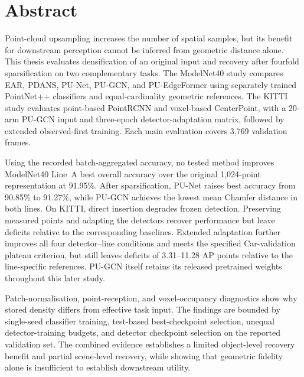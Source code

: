 \chapter*{Abstract}
Point-cloud upsampling increases the number of spatial samples, but its
benefit for downstream perception cannot be inferred from geometric
distance alone. This thesis evaluates densification of an original input
and recovery after fourfold sparsification on two complementary tasks.
The ModelNet40 study compares EAR, PDANS, PU-Net, PU-GCN, and PU-EdgeFormer
using separately trained PointNet++ classifiers and equal-cardinality
geometric references. The KITTI study evaluates point-based PointRCNN
and voxel-based CenterPoint, with a 20-arm PU-GCN input and three-epoch
detector-adaptation matrix, followed by extended observed-first training.
Each main evaluation covers 3,769 validation frames.

Using the recorded batch-aggregated accuracy, no tested method improves
ModelNet40 Line~A best overall accuracy over
the original 1,024-point representation at 91.95\%. After sparsification,
PU-Net raises best accuracy from 90.85\% to 91.27\%, while PU-GCN achieves
the lowest mean Chamfer distance in both lines. On KITTI, direct insertion
degrades frozen detection. Preserving measured points and adapting the
detectors recover performance but leave deficits relative to the
corresponding baselines. Extended adaptation further improves all four
detector--line conditions and meets the specified Car-validation plateau
criterion, but still leaves deficits of 3.31--11.28 AP points relative
to the line-specific references. PU-GCN itself retains its released
pretrained weights throughout this later study.

Patch-normalisation, point-reception, and voxel-occupancy diagnostics show
why stored density differs from effective task input. The findings are
bounded by single-seed classifier training, test-based best-checkpoint
selection, unequal detector-training budgets, and detector checkpoint
selection on the reported validation set. The combined evidence establishes a
limited object-level recovery benefit and partial scene-level recovery,
while showing that geometric fidelity alone is insufficient to establish
downstream utility.
